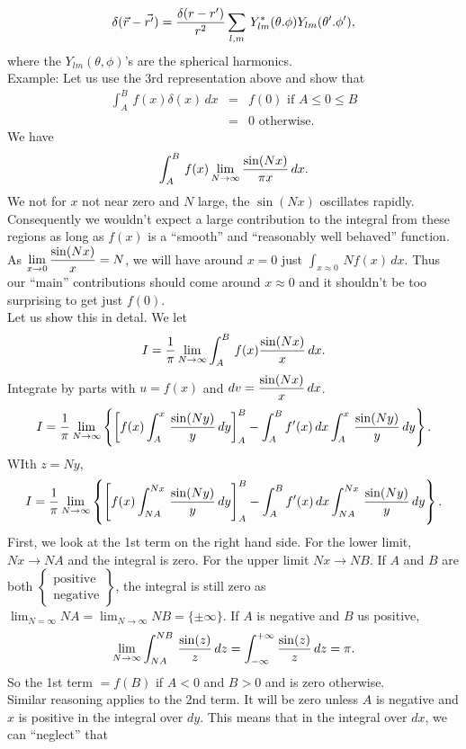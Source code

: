 $$\delta(\vec{r}-\vec{r'}) = {\delta(r - r')\over r^2} \sum_{l,m}\, Y_{lm}^*(\theta.\phi)Y_{lm}(\theta'.\phi'),$$ where the $Y_{lm}(\theta,\phi)$'s are the spherical harmonics.\\
Example: Let us use the 3rd representation above and show that 
\begin{eqnarray*}
\int_A^B\, f(x)\delta(x)\, dx &=& f(0) \mbox{ if } A \le 0 \le B\\
                                          &=& 0 \mbox{ otherwise.}
\end{eqnarray*} We have 
$$\int_A^B\, f(x) \lim_{N\rightarrow \infty} {\sin(Nx)\over \pi x}\, dx.$$ We not for $x$ not near zero and $N$ large, the $\sin(Nx)$ oscillates rapidly. Consequently we wouldn't expect a large contribution to the integral
from these regions as long as $f(x)$ is a ``smooth'' and ``reasonably well behaved'' function.\\
As $\displaystyle \lim_{x\rightarrow0} {\sin(Nx)\over x} = N$, we will have around $x=0$ just $\displaystyle \int_{x\approx0} \, N f(x)\, dx$. Thus our ``main'' contributions should come around
$x\approx0$ and it shouldn't be too surprising to get just $f(0)$.\\
Let us show this in detal. We let 
$$I = {1\over\pi}\lim_{N\rightarrow\infty} \int_A^B\, f(x) {\sin(Nx)\over x}\,dx.$$
Integrate by parts with $u=f(x)$ and $\displaystyle dv = {\sin(Nx)\over x}\,dx$.
$$I = {1\over\pi} \lim_{N\rightarrow\infty} \left\{\left[ f(x) \int_A^x\, {\sin(Ny)\over y} \, dy \right]_A^B  - \int_A^B f'(x)\,dx \int_A^x\, {\sin(Ny)\over y} \,dy \right\}.$$
WIth $z = Ny$, 
$$I = {1\over\pi}\lim_{N\rightarrow\infty} \left\{ \left[ f(x) \int_{NA}^{Nx}\, {\sin(Ny)\over y}\,dy\right]_A^B - \int_A^B f'(x)\,dx \int_{NA}^{Nx}\, {\sin(Ny)\over y}\,dy \right\}.$$
First, we look at the 1st term on the right hand side. For the lower limit, $Nx\rightarrow NA$ and the integral is zero. For the upper limit $Nx \rightarrow NB$. If $A$ and $B$ are both 
$\left\{\begin{matrix}
\mbox{positive} \\
\mbox{negative} 
\end{matrix}\right\}$, the integral is still zero as $\displaystyle \lim_{N=\infty} NA = \lim_{N \rightarrow \infty} NB = \{\pm \infty\}$.
If $A$ is negative and $B$ us positive, 
$$\lim_{N\rightarrow\infty}\int_{NA}^{NB}\, {\sin(z)\over z}\,dz = \int_{-\infty}^{+\infty} {\sin(z)\over z}\,dz = \pi.$$
So the 1st term $= f(B)$ if $A<0$ and $B>0$ and is zero otherwise.\\
Similar reasoning applies to the 2nd term. It will be zero unless $A$ is negative and $x$ is positive in the integral over $dy$. This means that in the integral over $dx$, we can ``neglect'' that
